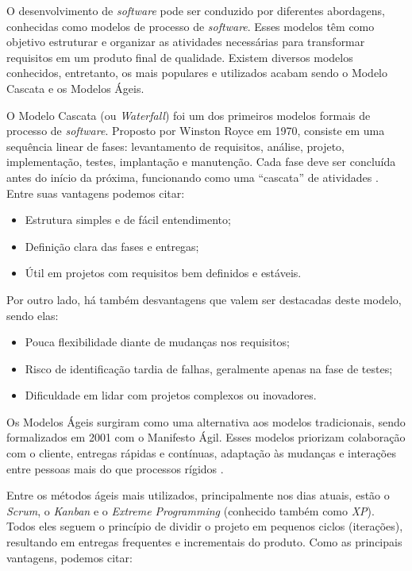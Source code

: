 \documentclass[english,brazilian]{UNISINOSartigo} %
\begin{document}
O desenvolvimento de \textit{software} pode ser conduzido por diferentes abordagens, conhecidas como modelos de processo de \textit{software}. Esses modelos têm como objetivo estruturar e organizar as atividades necessárias para transformar requisitos em um produto final de qualidade. Existem diversos modelos conhecidos, entretanto, os mais populares e utilizados acabam sendo o Modelo Cascata e os Modelos Ágeis.

O Modelo Cascata (ou \textit{Waterfall}) foi um dos primeiros modelos formais de processo de \textit{software}. Proposto por Winston Royce em 1970, consiste em uma sequência linear de fases: levantamento de requisitos, análise, projeto, implementação, testes, implantação e manutenção. Cada fase deve ser concluída antes do início da próxima, funcionando como uma “cascata” de atividades \cite{sommerville2011}. Entre suas vantagens podemos citar:

\begin{itemize}[leftmargin=1cm, itemsep=0.1em, topsep=0.1em]
    \item Estrutura simples e de fácil entendimento;
    \item Definição clara das fases e entregas;
    \item Útil em projetos com requisitos bem definidos e estáveis.
\end{itemize}

Por outro lado, há também desvantagens que valem ser destacadas deste modelo, sendo elas:

\begin{itemize}[leftmargin=1cm, itemsep=0.1em, topsep=0.1em]
    \item Pouca flexibilidade diante de mudanças nos requisitos;
    \item Risco de identificação tardia de falhas, geralmente apenas na fase de testes;
    \item Dificuldade em lidar com projetos complexos ou inovadores.
\end{itemize}

Os Modelos Ágeis surgiram como uma alternativa aos modelos tradicionais, sendo formalizados em 2001 com o Manifesto Ágil. Esses modelos priorizam colaboração com o cliente, entregas rápidas e contínuas, adaptação às mudanças e interações entre pessoas mais do que processos rígidos \cite{beck2001}.

Entre os métodos ágeis mais utilizados, principalmente nos dias atuais, estão o \textit{Scrum}, o \textit{Kanban} e o \textit{Extreme Programming} (conhecido também como \textit{XP}). Todos eles seguem o princípio de dividir o projeto em pequenos ciclos (iterações), resultando em entregas frequentes e incrementais do produto. Como as principais vantagens, podemos citar:
\end{document}
